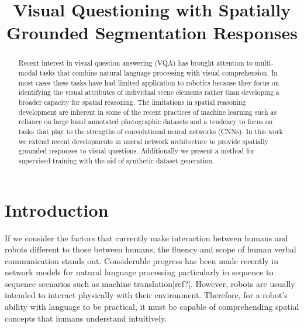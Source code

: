 \documentclass[conference]{IEEEtran}
\begin{document}
    
    \title{Visual Questioning with Spatially Grounded Segmentation Responses}
    
    \author{
    \and
    \and
    }
    
    \maketitle
    
    \begin{abstract}
Recent interest in visual question answering (VQA) has brought attention to multi-modal tasks that combine natural language processing with visual comprehension. In most cases these tasks have had limited application to robotics because they focus on identifying the visual attributes of individual scene elements rather than developing a broader capacity for spatial reasoning. The limitations in spatial reasoning development are inherent in some of the recent practices of machine learning such as reliance on large hand annotated photographic datasets and a tendency to focus on tasks that play to the strengths of convolutional neural networks (CNNs). In this work we extend recent developments in nueral network architecture to provide spatially grounded responses to visual questions.  Additionally we present a method for supervised training with the aid of synthetic dataset generation. 
    \end{abstract}

    \section{Introduction}
If we consider the factors that currently make interaction between humans and robots different to those between humans, the fluency and scope of human verbal communication stands out.  Considerable progress has been made recently in network models for natural language processing particularly in sequence to sequence scenarios such as machine translation[ref?].  However, robots are usually intended to interact physically with their environment.  Therefore, for a robot's ability with language to be practical, it must be capable of comprehending spatial concepts that humans understand intuitively. 
\end{document}
